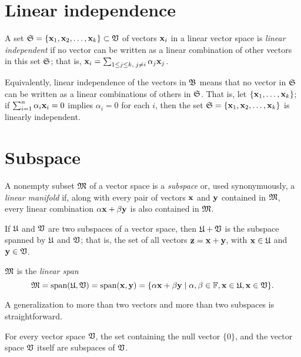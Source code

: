 \section{Linear independence}

A set ${\frak S}=\{
{\bf x}_1,
{\bf x}_2,
\ldots ,
{\bf x}_k\} \subset {\frak V}$
of vectors ${\bf x}_i$ in a linear vector space
is {\em linear independent}
if no vector  can be written as a linear combination of other vectors in this set ${\frak S}$;
that is,
${\bf x}_i=\sum_{1\le j \le k, \; j\neq i}\alpha_j {\bf x}_j$.

Equivalently, linear independence of the vectors in $\frak B$ means that
 no vector in  $\frak S$ can be written as a linear combinations of others in  $\frak S$.
That is, let  $\{
{\bf x}_1, \ldots , {\bf x}_k\}$;
if $\sum_{i=1}^n \alpha_i {\bf x}_i = 0$
implies $\alpha_i =0$ for each $i$, then the set
${\frak S}=\{
{\bf x}_1,
{\bf x}_2,
\ldots ,
{\bf x}_k\}  $ is linearly independent.

\section{Subspace}
\label{2011-m-subspace}
A nonempty subset ${\frak M}$ of a vector space is a {\em subspace}
or, used synonymuously,
a {\em linear manifold}
if, along with every pair of vectors ${\bf x}$   and  ${\bf y}$
contained in  ${\frak M}$,
every linear combination
$\alpha {\bf x} + \beta {\bf y}$ is also contained in  ${\frak M}$.

If
${\frak U}$
and
${\frak V}$
are two subspaces of a vector space,
then
${\frak U}+{\frak V}$
is the subspace spanned by
${\frak U}$
and
${\frak V}$;
that is,
the set of all vectors
${\bf z}={\bf x}+{\bf y}$, with
${\bf x}\in {\frak U}$  and
${\bf y}\in {\frak V}$.

${\frak M}$ is the {\em linear span}
\begin{equation}
{\frak M}
= \textrm{span}({\frak U},{\frak V})
= \textrm{span}({\bf x},{\bf y}) =
\{\alpha {\bf x} +\beta {\bf y}\mid \alpha ,\beta \in {\Bbb F}, {\bf x} \in {\frak U},
{\bf x} \in {\frak V}\}.
\end{equation}


A generalization to more than two vectors and more than two subspaces is straightforward.


For every vector space ${\frak V}$, the set
containing the null vector $\{0\}$,
and the vector space ${\frak V}$ itself are subspaces of ${\frak V}$.


